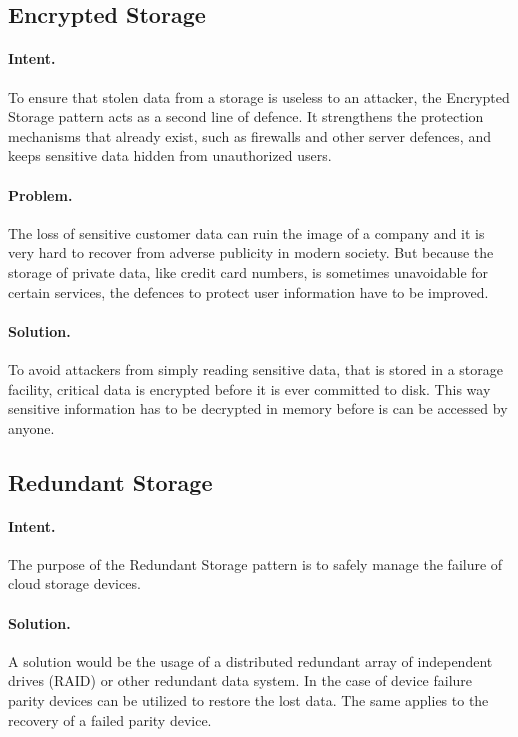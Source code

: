 \subsection{Encrypted Storage~\cite{Kienzle2006}} 
\label{p:es}

\paragraph{\textbf{Intent.}} To ensure that stolen data from a storage is useless to an attacker, the Encrypted Storage pattern acts as a second line of defence. It strengthens the protection mechanisms that already exist, such as firewalls and other server defences, and keeps sensitive data hidden from unauthorized users.

\paragraph{\textbf{Problem.}} The loss of sensitive customer data can ruin the image of a company and it is very hard to recover from adverse publicity in modern society. But because the storage of private data, like credit card numbers, is sometimes unavoidable for certain services, the defences to protect user information have to be improved.

\paragraph{\textbf{Solution.}} To avoid attackers from simply reading sensitive data, that is stored in a storage facility, critical data is encrypted before it is ever committed to disk. This way sensitive information has to be decrypted in memory before is can be accessed by anyone.


\subsection{Redundant Storage~\cite{Papoutsakis2021}} 
\label{p:rs}

\paragraph{\textbf{Intent.}} The purpose of the Redundant Storage pattern is to safely manage the failure of cloud storage devices.

\paragraph{\textbf{Solution.}} A solution would be the usage of a distributed redundant array of independent drives (RAID) or other redundant data system. In the case of device failure parity devices can be utilized to restore the lost data. The same applies to the recovery of a failed parity device.


